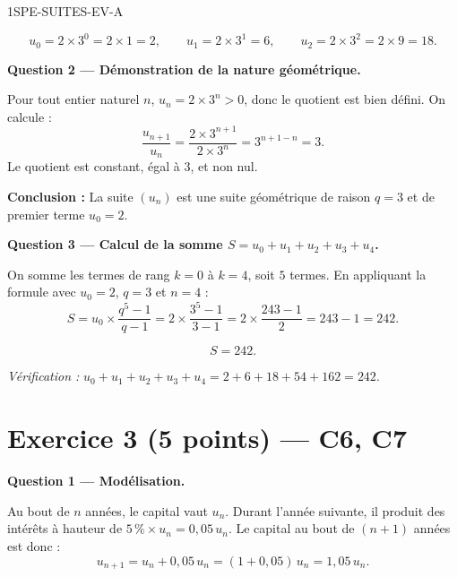 \begin{corrige}{1SPE-SUITES-EV-A}

\[
  u_0 = 2 \times 3^0 = 2 \times 1 = 2, \qquad
  u_1 = 2 \times 3^1 = 6, \qquad
  u_2 = 2 \times 3^2 = 2 \times 9 = 18.
\]

\medskip
\textbf{Question 2 — Démonstration de la nature géométrique.}


Pour tout entier naturel $n$, $u_n = 2 \times 3^n > 0$, donc le quotient est bien défini. On calcule :
\[
  \frac{u_{n+1}}{u_n} = \frac{2 \times 3^{n+1}}{2 \times 3^n} = 3^{n+1-n} = 3.
\]
Le quotient est constant, égal à $3$, et non nul.

\textbf{Conclusion :} La suite $(u_n)$ est une suite géométrique de raison $q = 3$ et de premier terme $u_0 = 2$.

\medskip
\textbf{Question 3 — Calcul de la somme $S = u_0 + u_1 + u_2 + u_3 + u_4$.}


On somme les termes de rang $k = 0$ à $k = 4$, soit $5$ termes. En appliquant la formule avec $u_0 = 2$, $q = 3$ et $n = 4$ :
\[
  S = u_0 \times \frac{q^5 - 1}{q - 1} = 2 \times \frac{3^5 - 1}{3 - 1} = 2 \times \frac{243 - 1}{2} = 243 - 1 = 242.
\]

\[
  \boxed{S = 242.}
\]

\textit{Vérification :} $u_0 + u_1 + u_2 + u_3 + u_4 = 2 + 6 + 18 + 54 + 162 = 242$. \checkmark

\section*{Exercice 3 \hfill (5 points) — C6, C7}


\bigskip
\textbf{Question 1 — Modélisation.}


Au bout de $n$ années, le capital vaut $u_n$. Durant l'année suivante, il produit des intérêts à hauteur de $5\,\% \times u_n = 0{,}05\,u_n$. Le capital au bout de $(n+1)$ années est donc :
\[
  u_{n+1} = u_n + 0{,}05\,u_n = (1 + 0{,}05)\,u_n = 1{,}05\,u_n.
\]


\end{corrige}
